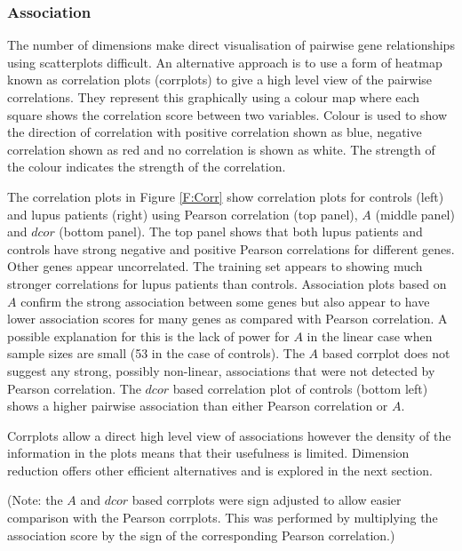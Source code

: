 \documentclass[a4paper, 12pt]{report}
\begin{document}
\subsubsection{Association}
The number of dimensions make direct visualisation of pairwise gene relationships using scatterplots difficult. An alternative approach is to use a form of heatmap known as correlation plots (corrplots) to  give a high level view of the pairwise correlations. They represent this graphically using a colour map where each square shows the correlation score between two variables. Colour is used to show the direction of correlation with positive correlation shown as blue, negative correlation shown as red and no correlation is shown as white. The strength of the colour indicates the strength of the correlation. 

The correlation plots in Figure \ref{F:Corr} show correlation plots for controls (left) and lupus patients (right) using Pearson correlation (top panel), $A$ (middle panel) and $dcor$ (bottom panel). The top panel shows that both lupus patients and controls have strong negative and positive Pearson correlations for different genes. Other genes appear uncorrelated. The training set appears to showing much stronger correlations for lupus patients than controls. Association plots based on $A$ confirm the strong association between some genes but also appear to have lower association scores for many genes as compared with Pearson correlation. A possible explanation for this is the lack of power for $A$ in the linear case when sample sizes are small (53 in the case of controls). The $A$ based corrplot does not suggest any strong, possibly non-linear, associations that were not detected by Pearson correlation. The $dcor$ based correlation plot of controls (bottom left) shows a higher pairwise association than either Pearson correlation or $A$. 

Corrplots allow a direct high level view of associations however the density of the information in the plots means that their usefulness is limited.  Dimension reduction offers other efficient alternatives and is explored in the next section. 

(Note: the $A$ and $dcor$ based corrplots were sign adjusted to allow easier comparison with the Pearson corrplots. This was performed by multiplying the association score by the sign of the corresponding Pearson correlation.) 
\end{document}
